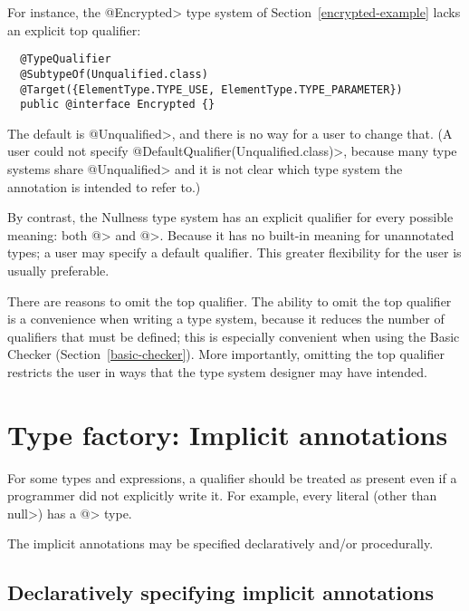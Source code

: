 For instance, the \<@Encrypted> type system of
Section~\ref{encrypted-example} lacks an explicit top qualifier:

\begin{Verbatim}
  @TypeQualifier
  @SubtypeOf(Unqualified.class)
  @Target({ElementType.TYPE_USE, ElementType.TYPE_PARAMETER})
  public @interface Encrypted {}
\end{Verbatim}


\noindent
The default is
\<@Unqualified>, and there is no way for a user to change that.
(A user could not specify \<@DefaultQualifier(Unqualified.class)>,
because many type systems share \<@Unqualified> and it is not clear which
type system the annotation is intended to refer to.)

By contrast, the Nullness type system has an explicit qualifier for every
possible meaning:  both \<@> and
\<@>.  Because it has no built-in meaning
for unannotated types; a user may specify a default qualifier.  This
greater flexibility for the user is usually preferable.

There are reasons to omit the top qualifier.
The ability to omit the top qualifier is a convenience
when writing a type system, because it reduces the number of qualifiers
that must be defined; this is especially convenient when using the Basic
Checker (Section~\ref{basic-checker}).
More importantly, omitting the top qualifier restricts the user in ways
that the type system designer may have intended.


\section{Type factory: Implicit annotations\label{writing-type-introduction}}

For some types and expressions, a qualifier should be treated as present
even if a programmer did not explicitly write it.  For example, every
literal (other than \<null>) has a \<@> type.

The implicit annotations may be specified declaratively and/or procedurally.


\subsection{Declaratively specifying implicit annotations\label{declarative-type-introduction}}

